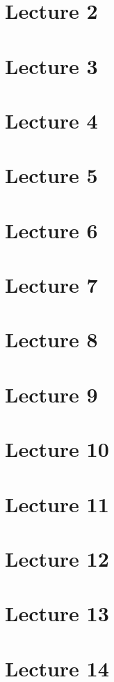 \documentclass[12pt,a4paper]{article}
\begin{document}
 
 
 \section*{Lecture 2}
 
 \section*{Lecture 3}
 
 \section*{Lecture 4}
 
 \section*{Lecture 5}
 
 \section*{Lecture 6}
 
 \section*{Lecture 7}
 
 \section*{Lecture 8}
 
 \section*{Lecture 9}
 
 \section*{Lecture 10}
 
 \section*{Lecture 11}
 
 \section*{Lecture 12}
 
 \section*{Lecture 13}
 
 \section*{Lecture 14}

\clearpage %

 
 
 
\end{document}
